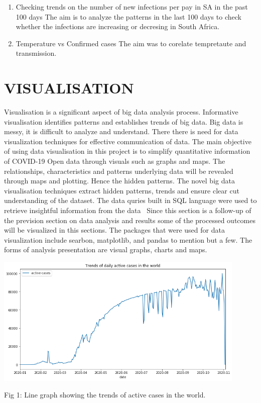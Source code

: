 \documentclass[12pt]{article}
\begin{document}
\begin{enumerate}
    
    \item Checking trends on the number of new infections per pay in SA in the past 100 days
    The aim is to analyze the patterns in the last 100 days  to check whether the infections are increasing or decresing in South Africa.
     
     \item Temperature vs Confirmed cases
     The aim was to corelate tempretaute and transmission. 
    
\end{enumerate}

\section{VISUALISATION}
Visualisation is a significant aspect of big data analysis process. Informative visualisation identifies patterns and establishes trends of big data. Big data is messy, it is difficult to analyze and understand. There there is need for data visualization techniques for effective communication of data. The main objective of using data visualisation in this project is to simplify quantitative information of COVID-19 Open data through visuals such as graphs and maps. The relationships, characteristics and patterns underlying data will be revealed through maps and plotting. Hence the  hidden patterns. The novel big data visualisation techniques extract hidden patterns, trends and ensure clear cut understanding of the dataset. The data quries built in SQL language were used to retrieve insightful information from the data
\
Since this section is a follow-up of the prevision section on data analysis and results some of the processed outcomes will be visualized in this sections. The packages that were used for data visualization include searbon, matplotlib, and pandas to mention but a few. The forms of analysis presentation are visual graphs, charts and maps.

\includegraphics[width=0.9\textwidth,inner]{activecases.png}
\caption{Fig 1: Line graph showing the trends of active cases in the world.}
\end{document}
